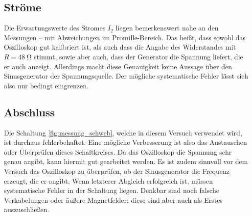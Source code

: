 \subsection{Ströme}
Die Erwartungswerte des Stromes $I_2$ liegen bemerkenswert nahe an den Messungen -- mit Abweichungen im Promille-Bereich. %
Das heißt, dass sowohl das Oszilloskop gut kalibriert ist, als auch dass die Angabe des Widerstandes mit $R = \SI{48}{\ohm}$ stimmt, sowie aber auch, dass der Generator die Spannung liefert, die er auch anzeigt.
Allerdings macht diese Genauigkeit keine Aussage über den Sinusgenerator der Spannungsquelle. Der mögliche systematische Fehler lässt sich also nur bedingt eingrenzen.

\subsection{Abschluss}
Die Schaltung \ref{fig:messung_schweb}, welche in diesem Versuch verwendet wird, ist durchaus fehlerbehaftet. Eine mögliche Verbesserung ist also das Austauschen oder Überprüfen dieses Schaltkreises.
Da das Oszilloskop die Spannung sehr genau angibt, kann hiermit gut gearbeitet werden. Es ist zudem sinnvoll vor dem Versuch %
das Oszilloskop zu überprüfen, %
ob der Sinusgenerator die Frequenz erzeugt, die er angibt.
Wenn letzterer Abgleich erfolgreich ist, müssen systematische Fehler in der Schaltung liegen. 
Denkbar sind noch falsche Verkabelungen oder äußere Magnetfelder; diese sind aber auch als Erstes auszuschließen.
\pagebreak


